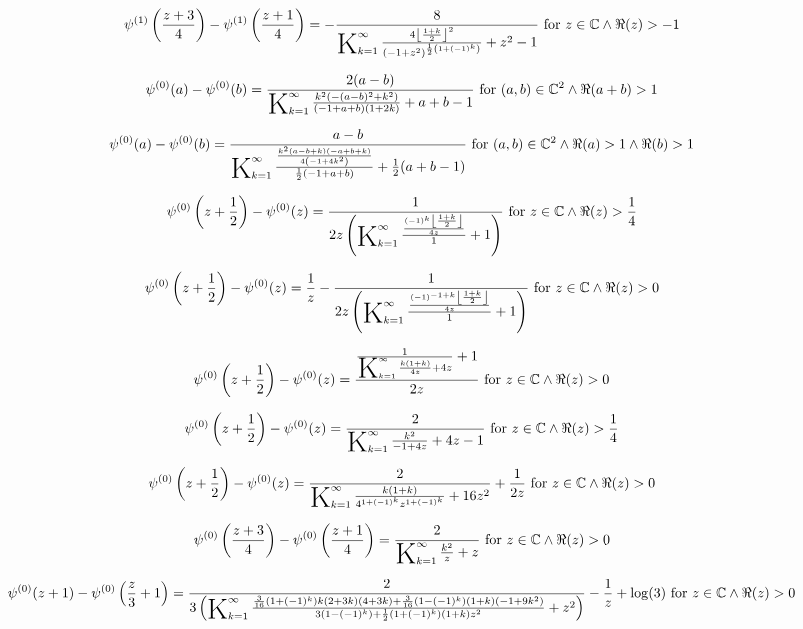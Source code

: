 \documentclass{article}
\newcommand{\bigK}{\mathop{\raisebox{-5pt}{\huge K}}}
\begin{document}
\[\psi ^{(1)}\left(\frac{z+3}{4}\right)-\psi ^{(1)}\left(\frac{z+1}{4}\right)=-\frac{8}{\bigK_{k=1}^{\infty}\frac{4 \left\lfloor \frac{1+k}{2}\right\rfloor ^2}{\left(-1+z^2\right)^{\frac{1}{2} \left(1+(-1)^k\right)}}+z^2-1}\text{ for }z\in \mathbb{C}\land \Re(z)>-1\] 

\[\psi ^{(0)}(a)-\psi ^{(0)}(b)=\frac{2 (a-b)}{\bigK_{k=1}^{\infty}\frac{k^2 \left(-(a-b)^2+k^2\right)}{(-1+a+b) (1+2 k)}+a+b-1}\text{ for }(a,b)\in \mathbb{C}^2\land \Re(a+b)>1\] 

\[\psi ^{(0)}(a)-\psi ^{(0)}(b)=\frac{a-b}{\bigK_{k=1}^{\infty}\frac{\frac{k^2 (a-b+k) (-a+b+k)}{4 \left(-1+4 k^2\right)}}{\frac{1}{2} (-1+a+b)}+\frac{1}{2} (a+b-1)}\text{ for }(a,b)\in \mathbb{C}^2\land \Re(a)>1\land \Re(b)>1\] 

\[\psi ^{(0)}\left(z+\frac{1}{2}\right)-\psi ^{(0)}(z)=\frac{1}{2 z \left(\bigK_{k=1}^{\infty}\frac{\frac{(-1)^k \left\lfloor \frac{1+k}{2}\right\rfloor }{4 z}}{1}+1\right)}\text{ for }z\in \mathbb{C}\land \Re(z)>\frac{1}{4}\] 

\[\psi ^{(0)}\left(z+\frac{1}{2}\right)-\psi ^{(0)}(z)=\frac{1}{z}-\frac{1}{2 z \left(\bigK_{k=1}^{\infty}\frac{\frac{(-1)^{-1+k} \left\lfloor \frac{1+k}{2}\right\rfloor }{4 z}}{1}+1\right)}\text{ for }z\in \mathbb{C}\land \Re(z)>0\] 

\[\psi ^{(0)}\left(z+\frac{1}{2}\right)-\psi ^{(0)}(z)=\frac{\frac{1}{\bigK_{k=1}^{\infty}\frac{k (1+k)}{4 z}+4 z}+1}{2 z}\text{ for }z\in \mathbb{C}\land \Re(z)>0\] 

\[\psi ^{(0)}\left(z+\frac{1}{2}\right)-\psi ^{(0)}(z)=\frac{2}{\bigK_{k=1}^{\infty}\frac{k^2}{-1+4 z}+4 z-1}\text{ for }z\in \mathbb{C}\land \Re(z)>\frac{1}{4}\] 

\[\psi ^{(0)}\left(z+\frac{1}{2}\right)-\psi ^{(0)}(z)=\frac{2}{\bigK_{k=1}^{\infty}\frac{k (1+k)}{4^{1+(-1)^k} z^{1+(-1)^k}}+16 z^2}+\frac{1}{2 z}\text{ for }z\in \mathbb{C}\land \Re(z)>0\] 

\[\psi ^{(0)}\left(\frac{z+3}{4}\right)-\psi ^{(0)}\left(\frac{z+1}{4}\right)=\frac{2}{\bigK_{k=1}^{\infty}\frac{k^2}{z}+z}\text{ for }z\in \mathbb{C}\land \Re(z)>0\] 

\[\psi ^{(0)}(z+1)-\psi ^{(0)}\left(\frac{z}{3}+1\right)=\frac{2}{3 \left(\bigK_{k=1}^{\infty}\frac{\frac{3}{16} \left(1+(-1)^k\right) k (2+3 k) (4+3 k)+\frac{3}{16} \left(1-(-1)^k\right) (1+k) \left(-1+9 k^2\right)}{3 \left(1-(-1)^k\right)+\frac{1}{2} \left(1+(-1)^k\right) (1+k) z^2}+z^2\right)}-\frac{1}{z}+\log (3)\text{ for }z\in \mathbb{C}\land \Re(z)>0\] 
\end{document}
